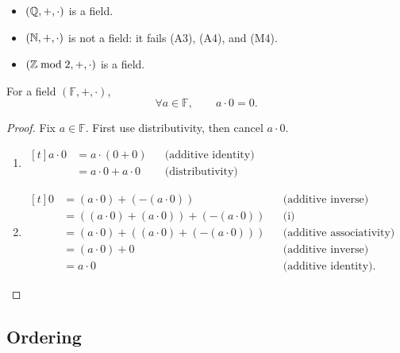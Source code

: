 \begin{example}
  \begin{itemize}
    \item $(\mathbb{Q},+,\cdot)$ is a field.
    \item $(\mathbb{N},+,\cdot)$ is not a field: it fails (A3), (A4), and (M4).
    \item $(\mathbb{Z}\bmod 2,+,\cdot)$ is a field.
  \end{itemize}
\end{example}

\begin{example}
  For a field $(\mathbb{F},+,\cdot)$,
  \[
    \forall a\in\mathbb{F},\qquad a\cdot0=0.
  \]
  \begin{proof}
    Fix $a\in\mathbb F$. First use distributivity, then cancel $a\cdot0$.
    \begin{enumerate}[label=(\roman*), proofparts]
      \item $
              \begin{aligned}[t]
                a\cdot0 & = a\cdot(0+0)     &  & \text{(additive identity)} \\
                        & = a\cdot0+a\cdot0 &  & \text{(distributivity)}
              \end{aligned}
            $
      \item $
              \begin{aligned}[t]
                0 & = (a\cdot0)+(-(a\cdot0))             &  & \text{(additive inverse)}       \\
                  & = ((a\cdot0)+(a\cdot0))+(-(a\cdot0)) &  & \text{(i)}                      \\
                  & = (a\cdot0)+((a\cdot0)+(-(a\cdot0))) &  & \text{(additive associativity)} \\
                  & = (a\cdot0)+0                        &  & \text{(additive inverse)}       \\
                  & = a\cdot0                            &  & \text{(additive identity).}
              \end{aligned}
            $
    \end{enumerate}
  \end{proof}
\end{example}

\subsection{Ordering}

